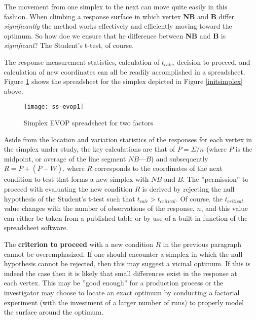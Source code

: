 The movement from one simplex to the next can move quite easily in this fashion.  When climbing a response surface in which vertex \textbf{NB} and \textbf{B} differ \textit{significantly} the method works effectively and efficiently moving toward the optimum.  So how doe we ensure that he difference between \textbf{NB} and \textbf{B} is \textit{significant}?  The Student's t-test, of course.

The response measurement statistics, calculation of $t_{calc}$, decision to proceed, and calculation of new coordinates can all be readily accomplished in a spreadsheet.  Figure \ref{ss-evop1} shows the spreadsheet for the simplex depicted in Figure \ref{initsimplex} above.

\begin{figure}[h]\caption{Simplex EVOP spreadsheet for two factors}\label{ss-evop1}
\begin{center}
\texttt{[image: ss-evop1]}
\end{center}
\end{figure}


Aside from the location and variation statistics of the responses for each vertex in the simplex under study, the key calculations are that of $\overline{P} = \Sigma/n$ (where $\overline{P}$ is the midpoint, or average of the line segment $NB$---$B$) and subsequently $R = \overline{P} + (\overline{P} - W)$, where $R$ corresponds to the coordinates of the next condition to test that forms a new simplex with $NB$ and $B$. The ''permission'' to proceed with evaluating the new condition $R$ is derived by rejecting the null hypothesis of the Student's t-test such that  $t_{calc} > t_{critical}$.  Of course, the $t_{critical}$ value changes with the number of observations of the response, $n$, and this value can either be taken from a published table or by use of a built-in function of the spreadsheet software.

The \textbf{criterion to proceed} with a new condition $R$ in the previous paragraph cannot be overemphasized. If one should encounter a simplex in which the null hypothesis cannot be rejected, then this may suggest a vicinal optimum. If this is indeed the case then it is likely that small differences exist in the response at each vertex.  This may be ''good enough'' for a production process or the investigator may choose to locate an exact optimum by conducting a factorial experiment (with the investment of a larger number of runs) to properly model the surface around the optimum.

